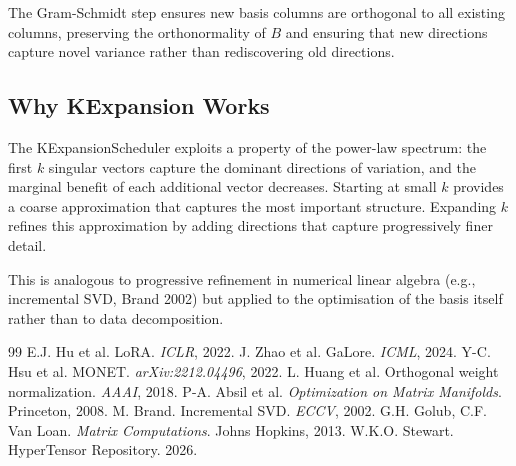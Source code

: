 \documentclass[11pt,a4paper]{article}
\begin{document}
The Gram-Schmidt step ensures new basis columns are orthogonal to all existing columns, preserving the orthonormality of $B$ and ensuring that new directions capture novel variance rather than rediscovering old directions.

\subsection{Why KExpansion Works}

The KExpansionScheduler exploits a property of the power-law spectrum: the first $k$ singular vectors capture the dominant directions of variation, and the marginal benefit of each additional vector decreases. Starting at small $k$ provides a coarse approximation that captures the most important structure. Expanding $k$ refines this approximation by adding directions that capture progressively finer detail.

This is analogous to progressive refinement in numerical linear algebra (e.g., incremental SVD, Brand 2002) but applied to the optimisation of the basis itself rather than to data decomposition.

\begin{thebibliography}{99}
 E.J. Hu et al. LoRA. \textit{ICLR}, 2022.
 J. Zhao et al. GaLore. \textit{ICML}, 2024.
 Y-C. Hsu et al. MONET. \textit{arXiv:2212.04496}, 2022.
 L. Huang et al. Orthogonal weight normalization. \textit{AAAI}, 2018.
 P-A. Absil et al. \textit{Optimization on Matrix Manifolds}. Princeton, 2008.
 M. Brand. Incremental SVD. \textit{ECCV}, 2002.
 G.H. Golub, C.F. Van Loan. \textit{Matrix Computations}. Johns Hopkins, 2013.
 W.K.O. Stewart. HyperTensor Repository. 2026.
\end{thebibliography}
\end{document}
